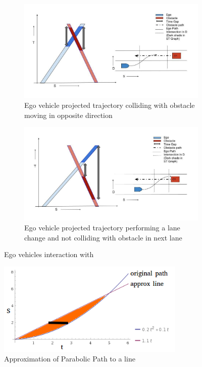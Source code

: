 \begin{figure}
	\centering
	\begin{subfigure}{.515\textwidth}
		\centering
		\includegraphics[width=1.0\textwidth]{Images/concept/dynamic_opposite_collision.jpg}
		\caption{Ego vehicle projected trajectory colliding with obstacle moving in opposite direction}
		\label{dynamic_opp1}
	\end{subfigure}%
	\begin{subfigure}{.485\textwidth}
		\centering
		\includegraphics[width=1.0\textwidth]{Images/concept/dynamic_opposite_nocollision.jpg}
		\caption{Ego vehicle projected trajectory performing a lane change and not colliding with obstacle in next lane}
		\label{dynamic_opp2}
	\end{subfigure}
	\caption{Ego vehicles interaction with }
	\label{dynamic_opp}
\end{figure}

 \begin{figure}
	\centering
	\includegraphics[width=0.8\textwidth]{Images/concept/dynamic_approx.png}
	\caption{Approximation of Parabolic Path to a line}
	\label{dynamic_approx}
\end{figure}

